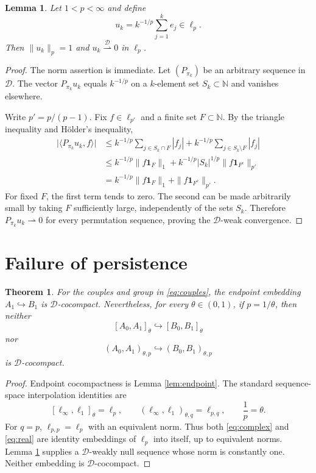 \documentclass[11pt]{article}
\newtheorem{theorem}{Theorem}
\newtheorem{lemma}{Lemma}
\newcommand{\N}{\mathbb N}
\newcommand{\D}{\mathcal D}
\begin{document}
\begin{lemma}\label{lem:flat}
Let $1<p<\infty$ and define
\[
 u_k=k^{-1/p}\sum_{j=1}^k e_j\in\ell_p.
 \tag{3}\label{eq:uk}
\]
Then $\|u_k\|_p=1$ and
$u_k\stackrel{\D}{\rightharpoonup}0$ in $\ell_p$.
\end{lemma}

\begin{proof}
The norm assertion is immediate.  Let $(P_{\pi_k})$ be an arbitrary sequence
in $\D$.  The vector $P_{\pi_k}u_k$ equals $k^{-1/p}$ on a $k$-element set
$S_k\subset\N$ and vanishes elsewhere.

Write $p'=p/(p-1)$.  Fix $f\in\ell_{p'}$ and a finite set $F\subset\N$.
By the triangle inequality and H\"older's inequality,
\begin{align*}
 \bigl|\langle P_{\pi_k}u_k,f\rangle\bigr|
 &\le k^{-1/p}\sum_{j\in S_k\cap F}|f_j|
     +k^{-1/p}\sum_{j\in S_k\setminus F}|f_j|\\
 &\le k^{-1/p}\|f\mathbf1_F\|_1
     +k^{-1/p}|S_k|^{1/p}\|f\mathbf1_{F^c}\|_{p'}\\
 &=k^{-1/p}\|f\mathbf1_F\|_1+\|f\mathbf1_{F^c}\|_{p'}.
 \tag{4}\label{eq:headtail}
\end{align*}
For fixed $F$, the first term tends to zero.  The second can be made
arbitrarily small by taking $F$ sufficiently large, independently of the
sets $S_k$.  Therefore $P_{\pi_k}u_k\rightharpoonup0$ for every permutation
sequence, proving the $\D$-weak convergence.
\end{proof}

\section{Failure of persistence}

\begin{theorem}\label{thm:main}
For the couples and group in \eqref{eq:couples}, the endpoint embedding
$A_1\hookrightarrow B_1$ is $\D$-cocompact.  Nevertheless, for every
$\theta\in(0,1)$, if $p=1/\theta$, then neither
\[
 [A_0,A_1]_\theta\hookrightarrow[B_0,B_1]_\theta
 \tag{5}\label{eq:complex}
\]
nor
\[
 (A_0,A_1)_{\theta,p}\hookrightarrow(B_0,B_1)_{\theta,p}
 \tag{6}\label{eq:real}
\]
is $\D$-cocompact.
\end{theorem}

\begin{proof}
Endpoint cocompactness is Lemma \ref{lem:endpoint}.  The standard
sequence-space interpolation identities are \cite{BL}
\[
 [\ell_\infty,\ell_1]_\theta=\ell_p,
 \qquad
 (\ell_\infty,\ell_1)_{\theta,q}=\ell_{p,q},
 \qquad \frac1p=\theta.
 \tag{7}\label{eq:interpolation}
\]
For $q=p$, $\ell_{p,p}=\ell_p$ with an equivalent norm.  Thus both
\eqref{eq:complex} and \eqref{eq:real} are identity embeddings of $\ell_p$
into itself, up to equivalent norms.  Lemma \ref{lem:flat} supplies a
$\D$-weakly null sequence whose norm is constantly one.  Neither embedding
is $\D$-cocompact.
\end{proof}
\end{document}
